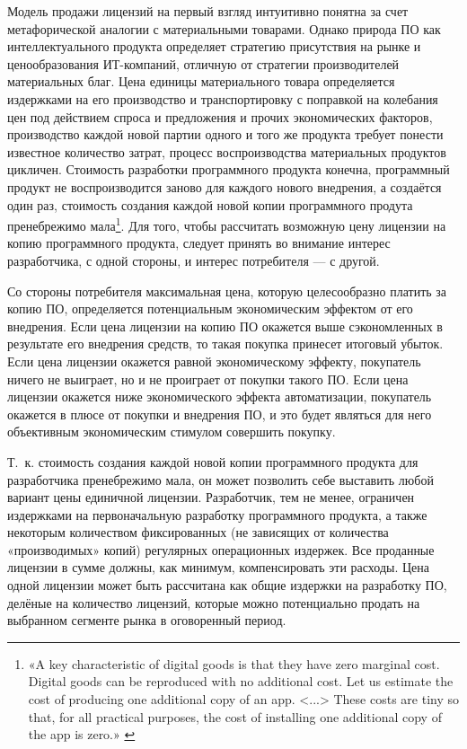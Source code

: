\documentclass{article}
\begin{document}
Модель продажи лицензий на первый взгляд интуитивно понятна за счет метафорической аналогии с материальными товарами. Однако природа ПО как интеллектуального продукта определяет стратегию присутствия на рынке и ценообразования ИТ-компаний, отличную от стратегии производителей материальных благ. Цена единицы материального товара определяется издержками на его производство и транспортировку с поправкой на колебания цен под действием спроса и предложения и прочих экономических факторов, производство каждой новой партии одного и того же продукта требует понести известное количество затрат, процесс воспроизводства материальных продуктов цикличен. Стоимость разработки программного продукта конечна, программный продукт не воспроизводится заново для каждого нового внедрения, а создаётся один раз, стоимость создания каждой новой копии программного продута пренебрежимо мала\footnote{«A key characteristic of digital goods is that they have zero marginal cost. Digital goods can be reproduced with no additional cost. Let us estimate the cost of producing one additional copy of an app. <...> These costs are tiny so that, for all practical purposes, the cost of installing one additional copy of the app is zero.» \cite{introToDigital}}. Для того, чтобы рассчитать возможную цену лицензии на копию программного продукта, следует принять во внимание интерес разработчика, с одной стороны, и интерес потребителя — с другой.

Со стороны потребителя максимальная цена, которую целесообразно платить за копию ПО, определяется потенциальным экономическим эффектом от его внедрения. Если цена лицензии на копию ПО окажется выше сэкономленных в результате его внедрения средств, то такая покупка принесет итоговый убыток. Если цена лицензии окажется равной экономическому эффекту, покупатель ничего не выиграет, но и не проиграет от покупки такого ПО. Если цена лицензии окажется ниже экономического эффекта автоматизации, покупатель окажется в плюсе от покупки и внедрения ПО, и это будет являться для него объективным экономическим стимулом совершить покупку.

Т.~к. стоимость создания каждой новой копии программного продукта для разработчика пренебрежимо мала, он может позволить себе выставить любой вариант цены единичной лицензии. Разработчик, тем не менее, ограничен издержками на первоначальную разработку программного продукта, а также некоторым количеством фиксированных (не зависящих от количества «производимых» копий) регулярных операционных издержек. Все проданные лицензии в сумме должны, как минимум, компенсировать эти расходы. Цена одной лицензии может быть рассчитана как общие издержки на разработку ПО, делёные на количество лицензий, которые можно потенциально продать на выбранном сегменте рынка в оговоренный период.
\end{document}
